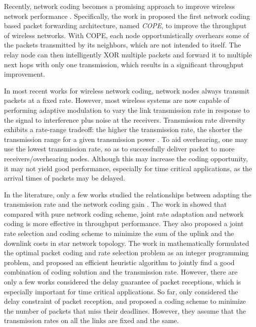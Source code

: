 \documentclass[journal]{IEEEtran}
\begin{document}
Recently, network coding becomes a promising approach to improve wireless network performance \cite{Sagduyu2007,ACL+2000Network1216,KRH+2008XORs510}. Specifically, the work in \cite{KRH+2008XORs510} proposed the first network coding based packet forwarding architecture, named {\em COPE}, to improve the throughput of wireless networks. With COPE, each node opportunistically overhears some of the packets transmitted by its neighbors, which are not intended to itself. The relay node can then intelligently XOR multiple packets and forward it to multiple next hops with only one transmission, which results in a significant throughput improvement.


In most recent works for wireless network coding, network nodes always transmit packets at a fixed rate. However, most wireless systems are now capable of performing adaptive modulation to vary the link transmission rate in response to the
signal to interference plus noise at the receivers. Transmission rate diversity exhibits a rate-range tradeoff: the higher the transmission rate, the shorter the transmission range for a given transmission power \cite{KV2009Is646}. To aid overhearing, one may use the lowest transmission rate, so as to successfully deliver packet to more receivers/overhearing nodes.
Although this may increase the coding opportunity, it may not yield good performance, especially for time critical applications, as the arrival times of packets may be delayed.

In the literature, only a few works studied the relationships between adapting the transmission rate and the network coding gain \cite{KV2009Is646,CJH2010Joint2444,Kim2010,Ni2008}. The work in \cite{KV2009Is646} showed that compared with pure network coding scheme, joint rate adaptation and network coding is more effective in throughput performance. They also proposed a joint rate selection and coding scheme to minimize the sum of the uplink and the downlink costs in star network topology. The work in \cite{CJH2010Joint2444} mathematically formulated the optimal packet coding and rate selection problem as an integer programming problem, and proposed an efficient heuristic algorithm to jointly find a good combination of coding solution and the transmission rate. However, there are only a few works considered the delay guarantee of packet receptions, which is especially important for time critical applications. So far, only \cite{ZX2010Broadcast6} considered the delay constraint of packet reception, and proposed a coding scheme to minimize the number of packets that miss their deadlines. However, they assume that the transmission rates on all the links are fixed and the same.
\end{document}
